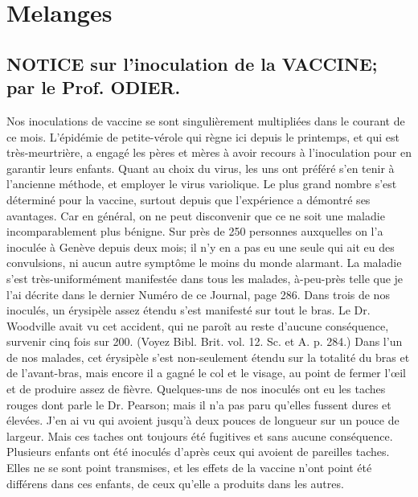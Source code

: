 \setcounter{page}{394}
\chapter{Melanges}
\section{NOTICE sur l'inoculation de la VACCINE; par le Prof. ODIER.}
Nos inoculations de vaccine se sont singulièrement multipliées dans le courant de ce mois. L'épidémie de petite-vérole qui règne ici depuis le printemps, et qui est très-meurtrière, a engagé les pères et mères à avoir recours à l'inoculation pour en garantir leurs enfants. Quant au choix du virus, les uns ont préféré s'en tenir à l'ancienne méthode, et employer le virus variolique. Le plus grand nombre s'est déterminé pour la vaccine, surtout depuis que l'expérience a démontré ses avantages. Car en général, on ne peut disconvenir que ce ne soit une maladie incomparablement plus bénigne. Sur près de 250\setcounter{page}{395} personnes auxquelles on l'a inoculée à Genève depuis deux mois; il n'y en a pas eu une seule qui ait eu des convulsions, ni aucun autre symptôme le moins du monde alarmant. La maladie s'est très-uniformément manifestée dans tous les malades, à-peu-près telle que je l'ai décrite dans le dernier Numéro de ce Journal, page 286. Dans trois de nos inoculés, un érysipèle assez étendu s'est manifesté sur tout le bras. Le Dr. Woodville avait vu cet accident, qui ne paroît au reste d'aucune conséquence, survenir cinq fois sur 200. (Voyez Bibl. Brit. vol. 12. Sc. et A. p. 284.) Dans l'un de nos malades, cet érysipèle s'est non-seulement étendu sur la totalité du bras et de l'avant-bras, mais encore il a gagné le col et le visage, au point de fermer l'œil et de produire assez de fièvre.
Quelques-uns de nos inoculés ont eu les taches rouges dont parle le Dr. Pearson; mais il n'a pas paru qu'elles fussent dures et élevées. J'en ai vu qui avoient jusqu'à deux pouces de longueur sur un pouce de largeur. Mais ces taches ont toujours été fugitives et sans aucune conséquence. Plusieurs enfants ont été inoculés d'après ceux qui avoient de pareilles taches. Elles ne se sont point transmises, et les effets de la vaccine n'ont point été différens dans ces enfants, de ceux qu'elle a produits dans les autres.
\setcounter{page}{396}
